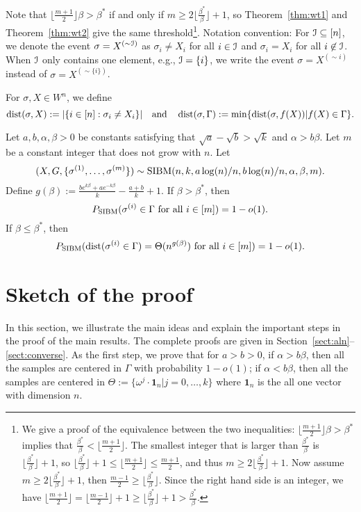 \documentclass{article}
\begin{document}
Note that $\lfloor \frac{m+1}{2} \rfloor \beta>\beta^\ast$ if and only if $m\ge 2 \Big\lfloor \frac{\beta^\ast}{\beta} \Big\rfloor +1$, so Theorem~\ref{thm:wt1} and Theorem~\ref{thm:wt2} give the same threshold\footnote{We give a proof of the equivalence between the two inequalities: $\lfloor \frac{m+1}{2} \rfloor \beta>\beta^\ast$ implies that $\frac{\beta^\ast}{\beta}<\lfloor \frac{m+1}{2} \rfloor$. The smallest integer that is larger than $\frac{\beta^\ast}{\beta}$ is $\lfloor \frac{\beta^\ast}{\beta}\rfloor +1$, so $\lfloor \frac{\beta^\ast}{\beta} \rfloor +1 \le \lfloor \frac{m+1}{2} \rfloor\le \frac{m+1}{2}$, and thus $m\ge 2 \Big\lfloor \frac{\beta^\ast}{\beta} \Big\rfloor +1$. Now assume $m\ge 2 \Big\lfloor \frac{\beta^\ast}{\beta} \Big\rfloor +1$, then $\frac{m-1}{2} \ge \lfloor \frac{\beta^\ast}{\beta} \rfloor$. Since the right hand side is an integer, we have $\lfloor \frac{m+1}{2} \rfloor = \lfloor \frac{m-1}{2} \rfloor +1  \ge \lfloor \frac{\beta^\ast}{\beta} \rfloor +1 >\frac{\beta^\ast}{\beta}$.}.
Notation convention:
For $\mathcal{I} \subseteq [n]$, we denote the event $\sigma = X^{(\sim \mathcal{I})}$ as $\sigma_i \neq X_i$ for all $i \in \mathcal{I}$ and $\sigma_i = X_i$ for all $i \not\in \mathcal{I}$.
When $\mathcal{I}$ only contains one element, e.g., $\mathcal{I}=\{i\}$, we write the event $\sigma = X^{(\sim i)}$ instead of $\sigma = X^{(\sim\{i\})}$.

For $\sigma,X\in W^n$, we define
$$
\operatorname{dist}(\sigma, X)
:=|\{i\in[n]:\sigma_i\neq X_i\}| 
\quad \text{and} \quad
\operatorname{dist}(\sigma,\Gamma)
:=\min\{\operatorname{dist}(\sigma, f(X)) | f(X) \in \Gamma\} .
$$
\begin{theorem}  \label{thm:wt3}
Let $a,b,\alpha,\beta> 0$ be constants satisfying that $\sqrt{a}-\sqrt{b} > \sqrt{k}$ and $\alpha>b\beta$. Let $m$ be a constant integer that does not grow with $n$.
Let 
$$
(X,G,\{\sigma^{(1)},\dots,\sigma^{(m)}\}) \sim \operatorname{SIBM}(n,k, a\log(n)/n, b\log(n)/n,\alpha,\beta,m).
$$
Define $g(\beta)  := \frac{b e^{k\beta}+a e^{-k\beta}}{k}-\frac{a+b}{k}+1$.
If $\beta>\beta^\ast$, then
$$
P_{\operatorname{SIBM}}(\sigma^{(i)} \in \Gamma \text{~for all~} i\in[m]) = 1-o(1).
$$
If $\beta\le \beta^\ast$, then
$$
P_{\operatorname{SIBM}}(\operatorname{dist}(\sigma^{(i)} \in \Gamma)= \Theta(n^{g(\beta)}) \text{~for all~} i\in[m]) = 1-o(1) .
$$
\end{theorem}

\section{Sketch of the proof}
\label{sect:sketch}

In this section, we illustrate the main ideas and explain the important steps in the proof of the main results. The complete proofs are given in Section~\ref{sect:aln}--\ref{sect:converse}.
As the first step, we prove that for $a>b>0$, if $\alpha>b\beta$, then all the samples are centered in $\Gamma$ with probability $1-o(1)$; if $\alpha<b\beta$, then all the samples are centered in $\Theta := \{ \omega^j  \cdot \mathbf{1}_n | j=0, \dots,k\}$ where $\mathbf{1}_n$ is the all one vector with dimension $n$.
\end{document}
